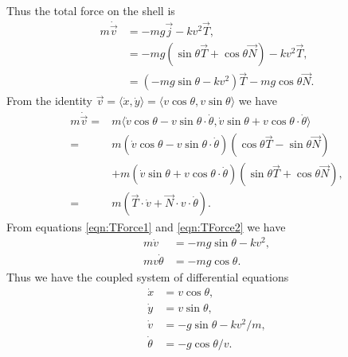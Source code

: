 Thus the total force on the shell is
\begin{align}
m \dot{\vec{v}} &= -mg \vec{j} - kv^2 \vec{T},\nonumber \\
&= -mg( \sin{\theta} \vec{T} + \cos{\theta} \vec{N} ) - kv^2 \vec{T},\nonumber\\
&= (-mg \sin{\theta} - k v^2 ) \vec{T} - mg \cos{\theta} \vec{N}.\label{eqn:TForce1}
\end{align}
From the identity
$\vec{v} = \langle \dot{x}, \dot{y} \rangle = \langle v \cos{\theta}, v \sin{\theta} \rangle$
we have
\begin{align}
m \dot{\vec{v}} = {} & m\langle \dot{v} \cos{\theta} - v\sin{\theta} \cdot \dot{\theta} ,\dot{v}\sin{\theta} + v\cos{\theta} \cdot \dot{\theta} \rangle \nonumber \\
= {} & m(\dot{v}\cos{\theta} - v\sin{\theta} \cdot \dot{\theta})(\cos{\theta} \vec{T} - \sin{\theta}\vec{N}) \nonumber \\
& + m(\dot{v} \sin{\theta} + v\cos{\theta} \cdot \dot{\theta})( \sin{\theta} \vec{T} + \cos{\theta} \vec{N}) ,  \nonumber \\
= {} & m(\vec{T} \cdot \dot{v} + \vec{N} \cdot v \cdot \dot{\theta}) . 
%
\end{align}
From equations \eqref{eqn:TForce1} and \eqref{eqn:TForce2} we have
\begin{align*}
m \dot{v} &= -mg\sin{\theta} - k v^2,\\
mv\dot{\theta} &= -mg \cos{\theta}.
\end{align*}
Thus we have the coupled system of differential equations
\begin{align}
\dot{x} &= v\cos{\theta}, \nonumber \\
\dot{y} &= v\sin{\theta},\nonumber \\
\dot{v} &= -g\sin{\theta} -  k v^2/m,\nonumber \\
\dot{\theta} &= -g \cos{\theta}/v. \nonumber
\end{align}

